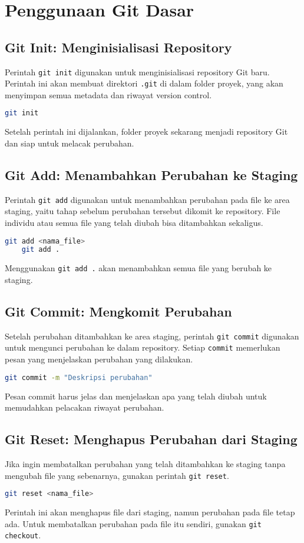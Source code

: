\chapter{Penggunaan Git Dasar}

\section{Git Init: Menginisialisasi Repository}
Perintah \texttt{git init} digunakan untuk menginisialisasi repository Git baru. Perintah ini akan membuat direktori \texttt{.git} di dalam folder proyek, yang akan menyimpan semua metadata dan riwayat version control.
\begin{lstlisting}[language=bash]
	git init
\end{lstlisting}
Setelah perintah ini dijalankan, folder proyek sekarang menjadi repository Git dan siap untuk melacak perubahan.

\section{Git Add: Menambahkan Perubahan ke Staging}
Perintah \texttt{git add} digunakan untuk menambahkan perubahan pada file ke area staging, yaitu tahap sebelum perubahan tersebut dikomit ke repository. File individu atau semua file yang telah diubah bisa ditambahkan sekaligus.
\begin{lstlisting}[language=bash]
	git add <nama_file>
	git add .
\end{lstlisting}
Menggunakan \texttt{git add .} akan menambahkan semua file yang berubah ke staging.

\section{Git Commit: Mengkomit Perubahan}
Setelah perubahan ditambahkan ke area staging, perintah \texttt{git commit} digunakan untuk mengunci perubahan ke dalam repository. Setiap \texttt{commit} memerlukan pesan yang menjelaskan perubahan yang dilakukan.
\begin{lstlisting}[language=bash]
	git commit -m "Deskripsi perubahan"
\end{lstlisting}
Pesan commit harus jelas dan menjelaskan apa yang telah diubah untuk memudahkan pelacakan riwayat perubahan.

\section{Git Reset: Menghapus Perubahan dari Staging}
Jika ingin membatalkan perubahan yang telah ditambahkan ke staging tanpa mengubah file yang sebenarnya, gunakan perintah \texttt{git reset}.
\begin{lstlisting}[language=bash]
	git reset <nama_file>
\end{lstlisting}
Perintah ini akan menghapus file dari staging, namun perubahan pada file tetap ada. Untuk membatalkan perubahan pada file itu sendiri, gunakan \texttt{git checkout}.

